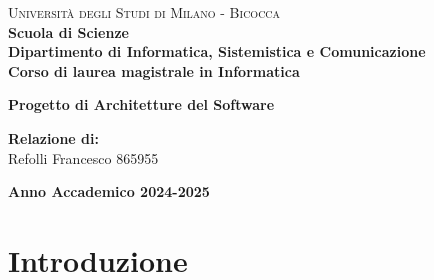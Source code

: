 \documentclass[a4paper,11pt,oneside, table]{article}
\begin{document}
    \begin{titlepage}
        \noindent
        \begin{minipage}[t]{0.19\textwidth}
        \end{minipage}
        \begin{minipage}[t]{0.81\textwidth}
        {
                {\textsc{Università degli Studi di Milano - Bicocca}} \\
                \textbf{Scuola di Scienze} \\
                \textbf{Dipartimento di Informatica, Sistemistica e Comunicazione} \\
                \textbf{Corso di laurea magistrale in Informatica} \\
                \par
        }
        \end{minipage}
    	\vspace{40mm}
    	\begin{center}
            {\LARGE{
                    \textbf{Progetto di Architetture del Software}
                    \par
            }}
        \end{center}
        
        \vspace{50mm}
        
        \vspace{15mm}

        \begin{flushright}
            {\large \textbf{Relazione di:}} \\
            \large{Refolli Francesco} \large{865955}
        \end{flushright}
        
        \vspace{40mm}
        \begin{center}
            {\large{\bf Anno Accademico 2024-2025}}
        \end{center}
        \restoregeometry
    \end{titlepage}

    \printindex
    \tableofcontents
    \renewcommand{\baselinestretch}{1.5}

\section{Introduzione}
\end{document}
